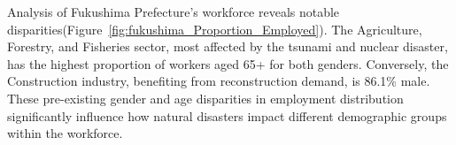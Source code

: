 \documentclass[12pt,halfline,a4paper]{ouparticle}
\begin{document}


Analysis of Fukushima Prefecture's workforce reveals notable disparities(Figure~\ref{fig:fukushima_Proportion_Employed}). The Agriculture, Forestry, and Fisheries sector, most affected by the tsunami and nuclear disaster, has the highest proportion of workers aged 65+ for both genders. Conversely, the Construction industry, benefiting from reconstruction demand, is 86.1\% male. These pre-existing gender and age disparities in employment distribution significantly influence how natural disasters impact different demographic groups within the workforce.
\end{document}
